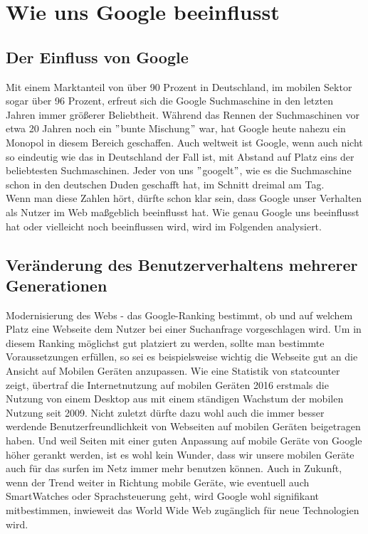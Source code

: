 \section{Wie uns Google beeinflusst}\label{sec:wie-uns-google-beeinflusst}

\subsection{Der Einfluss von Google}\label{subsec:der-einfluss-von-google}
Mit einem Marktanteil von über 90 Prozent in Deutschland, im mobilen Sektor sogar über 96 Prozent, erfreut sich die Google Suchmaschine in den letzten Jahren immer größerer Beliebtheit.
Während das Rennen der Suchmaschinen vor etwa 20 Jahren noch ein \("\)bunte Mischung\("\) war, hat Google heute nahezu ein Monopol in diesem Bereich geschaffen.
Auch weltweit ist Google, wenn auch nicht so eindeutig wie das in Deutschland der Fall ist, mit Abstand auf Platz eins der beliebtesten Suchmaschinen.
Jeder von uns \("\)googelt\("\)\autocite{DUD22}, wie es die Suchmaschine schon in den deutschen Duden geschafft hat, im Schnitt dreimal am Tag.\autocite{DOL22}\\
Wenn man diese Zahlen hört, dürfte schon klar sein, dass Google unser Verhalten als Nutzer im Web maßgeblich beeinflusst hat.
Wie genau Google uns beeinflusst hat oder vielleicht noch beeinflussen wird, wird im Folgenden analysiert.

\subsection{Veränderung des Benutzerverhaltens mehrerer Generationen}\label{subsec:veränderung-des-benutzerverhaltens-mehrerer-generationen}
Modernisierung des Webs - das Google-Ranking bestimmt, ob und auf welchem Platz eine Webseite dem Nutzer bei einer Suchanfrage vorgeschlagen wird.
Um in diesem Ranking möglichst gut platziert zu werden, sollte man bestimmte Voraussetzungen erfüllen, so sei es beispielsweise wichtig die Webseite gut an die Ansicht auf Mobilen Geräten anzupassen.\autocite{BUI22}
Wie eine Statistik von statcounter zeigt, übertraf die Internetnutzung auf mobilen Geräten 2016 erstmals die Nutzung von einem Desktop aus mit einem ständigen Wachstum der mobilen Nutzung seit 2009.\autocite{STA16}
Nicht zuletzt dürfte dazu wohl auch die immer besser werdende Benutzerfreundlichkeit von Webseiten auf mobilen Geräten beigetragen haben.
Und weil Seiten mit einer guten Anpassung auf mobile Geräte von Google höher gerankt werden, ist es wohl kein Wunder, dass wir unsere mobilen Geräte auch für das surfen im Netz immer mehr benutzen können.
Auch in Zukunft, wenn der Trend weiter in Richtung mobile Geräte, wie eventuell auch SmartWatches oder Sprachsteuerung geht,
wird Google wohl signifikant mitbestimmen, inwieweit das World Wide Web zugänglich für neue Technologien wird.\\

